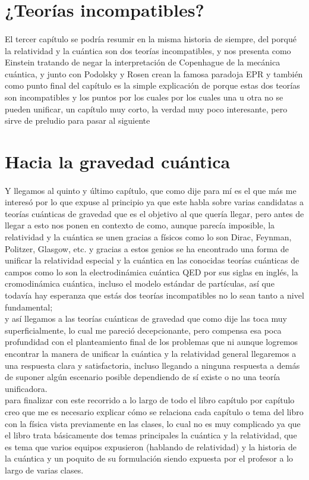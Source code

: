 \documentclass[12pt]{article}
\begin{document}
\section*{¿Teorías incompatibles?}
\paragraph*{}
\textsf{El tercer capítulo se podría resumir en la misma historia de siempre, del porqué la relatividad y la cuántica son dos teorías incompatibles,
y nos presenta como Einstein tratando de negar la interpretación de Copenhague de la mecánica cuántica, y junto con Podolsky y Rosen crean la famosa paradoja EPR
y también como punto final del capítulo es la simple explicación de porque estas dos teorías son incompatibles y los puntos por los cuales
por los cuales una u otra no se pueden unificar, un capítulo muy corto, la verdad muy poco interesante, pero sirve de preludio para pasar al siguiente}
\section*{Hacia la gravedad cuántica}
\paragraph*{}
\textsf{Y llegamos al quinto y último capítulo, que como dije para mí es el que más me interesó por lo que expuse al 
principio ya que este habla sobre varias candidatas a teorías cuánticas de gravedad que es el objetivo al que quería 
llegar, pero antes de llegar a esto nos ponen en contexto de como, aunque parecía imposible, la relatividad y la cuántica se unen
gracias a físicos como lo son Dirac, Feynman, Politzer, Glasgow, etc. y gracias a estos genios
se ha encontrado una forma de unificar la relatividad especial y la cuántica en las conocidas teorías cuánticas de campos como lo son 
la electrodinámica cuántica QED por sus siglas en inglés, la cromodinámica cuántica, incluso el modelo estándar 
de partículas, así que todavía hay esperanza que estás dos teorías incompatibles no lo sean tanto a nivel fundamental;\\
y así llegamos a las teorías cuánticas de gravedad que como dije las toca muy superficialmente, lo cual me pareció decepcionante, pero compensa esa poca profundidad con el 
planteamiento final de los problemas que ni aunque logremos encontrar la manera de unificar la cuántica y la 
relatividad general llegaremos a una respuesta clara y satisfactoria, incluso llegando a ninguna respuesta a demás de suponer algún escenario posible dependiendo
de sí existe o no una teoría unificadora.\\
para finalizar con este recorrido a lo largo de todo el libro capítulo por capítulo
creo que me es necesario explicar cómo se relaciona cada capítulo o tema del libro con la física vista previamente 
en las clases, lo cual no es muy complicado ya que el libro trata básicamente dos temas principales la cuántica y la relatividad, que es tema
que varios equipos expusieron (hablando de relatividad) y la historia de la cuántica y un poquito de su formulación siendo expuesta por el profesor
a lo largo de varias clases.}
\end{document}
